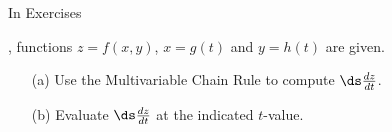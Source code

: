 {\noindent In Exercises} 
{,  functions $z=f(x,y)$, $x=g(t)$ and $y=h(t)$ are given.
\begin{enumerate}
	\item[(a)] Use the Multivariable Chain Rule to compute $\ds \frac{dz}{dt}$.
	\item[(b)] Evaluate $\ds \frac{dz}{dt}$ at the indicated $t$-value.
\end{enumerate}
}
